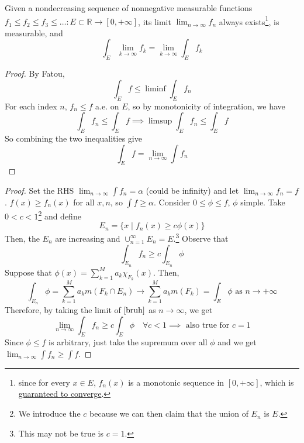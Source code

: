   \begin{theorem}
    Given a nondecreasing sequence of nonnegative measurable functions $f_1 \leq f_2 \leq f_3 \leq \ldots : E \subset \mathbb{R} \longrightarrow [0, +\infty]$, its limit $\lim_{n \rightarrow \infty} f_n$ always exists\footnote{since for every $x \in E$, $f_n(x)$ is a monotonic sequence in $[0, +\infty]$, which is \hyperref[real-thm:monotone-convergence]{guaranteed to converge}.}, is measurable, and 
    \begin{equation}
      \int_E \lim_{k \rightarrow \infty} f_k = \lim_{k \rightarrow \infty} \int_E f_k
    \end{equation}
  \end{theorem}
  \begin{proof}
    By Fatou, 
    \begin{equation}
      \int_E f \leq \liminf \int_E f_n
    \end{equation}
    For each index $n$, $f_n \leq f$ a.e. on $E$, so by monotonicity of integration, we have 
    \begin{equation}
      \int_E f_n \leq \int_E f \implies \limsup \int_E f_n \leq \int_E f
    \end{equation}
    So combining the two inequalities give 
    \begin{equation}
      \int_E f = \lim_{n \to \infty} \int f_n
    \end{equation}
  \end{proof}
  \begin{proof}
    Set the RHS $\lim_{n \to \infty} \int f_n = \alpha$ (could be infinity) and let $\lim_{n \to \infty} f_n = f$. $f(x) \geq f_n (x)$ for all $x, n$, so $\int f \geq \alpha$. Consider $0 \leq \phi \leq f$, $\phi$ simple. Take $0 < c < 1$\footnote{We introduce the $c$ because we can then claim that the union of $E_n$ is $E$.} and define 
    \begin{equation}
      E_n = \{ x \mid f_n (x) \geq c \phi(x) \} 
    \end{equation} 
    Then, the $E_n$ are increasing and $\cup_{n=1}^\infty E_n = E$.\footnote{This may not be true is $c = 1$.} Observe that 
    \begin{equation}
      \label{bruh}
      \int_{E_n} f_n \geq c \int_{E_n} \phi  
    \end{equation}
    Suppose that $\phi (x) = \sum_{k=1}^M a_k \chi_{F_k} (x)$. Then, 
    \begin{equation}
      \int_{E_n} \phi = \sum_{k=1}^M a_k m(F_k \cap E_n) \to \sum_{k=1}^M a_k m(F_k) = \int_E \phi \text{ as } n \to +\infty
    \end{equation} 
    Therefore, by taking the limit of $\ref{bruh}$ as $n \to \infty$, we get 
    \begin{equation}
      \lim_{n \to \infty} \int_E f_n \geq c \int_E \phi \quad \forall c < 1 \implies \text{ also true for } c = 1
    \end{equation}
    Since $\phi \leq f$ is arbitrary, just take the supremum over all $\phi$ and we get $\lim_{n \to \infty} \int f_n \geq \int f $. 
  \end{proof}

